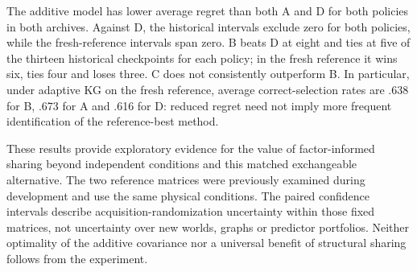 The additive model has lower average regret than both A and D for both policies in both archives. Against D, the historical intervals exclude zero for both policies, while the fresh-reference intervals span zero. B beats D at eight and ties at five of the thirteen historical checkpoints for each policy; in the fresh reference it wins six, ties four and loses three. C does not consistently outperform B. In particular, under adaptive KG on the fresh reference, average correct-selection rates are .638 for B, .673 for A and .616 for D: reduced regret need not imply more frequent identification of the reference-best method.

These results provide exploratory evidence for the value of factor-informed sharing beyond independent conditions and this matched exchangeable alternative. The two reference matrices were previously examined during development and use the same physical conditions. The paired confidence intervals describe acquisition-randomization uncertainty within those fixed matrices, not uncertainty over new worlds, graphs or predictor portfolios. Neither optimality of the additive covariance nor a universal benefit of structural sharing follows from the experiment.

